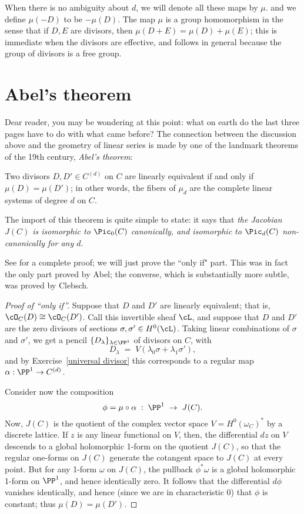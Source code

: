 When there is no ambiguity about $d$, we will denote all these maps  by $\mu$.  and  
we define $\mu(-D)$ to be $-\mu(D)$. 
The map $\mu$ is a group homomorphism in the sense that if $D, E$ are divisors, then
$\mu (D+E) = \mu(D) + \mu(E)$; this is immediate when the divisors are effective, and 
follows in general because the group of divisors is a free group.

\section{Abel's theorem}

Dear reader, you may be wondering at this point: what on earth do the last three pages have to do with what came before? The connection between the discussion above and the geometry of linear series is made by one of the landmark theorems of the 19th century, \emph{Abel's theorem}:

\begin{theorem}
Two divisors $D, D' \in C^{(d)}$ on $C$ are linearly equivalent if and only if $\mu(D) = \mu(D')$; in other words, the fibers of $\mu_d$ are the complete linear systems of degree $d$ on $C$.
\end{theorem}

The import of this theorem is quite simple to state: it says that \emph{the Jacobian $J(C)$ is isomorphic to $\Pic_0(C)$ canonically, and isomorphic to $\Pic_d(C)$ non-canonically for any $d$}.

See \cite[Section 2.2]{Griffiths-Harris1978}  for a complete proof; we will just prove the ``only if" part. This was in fact the only part proved by Abel; the converse, which is substantially more subtle, was proved by Clebsch.

\begin{proof}[Proof of ``only if'']
Suppose that $D$ and $D'$ are linearly equivalent; that is, $\cO_C(D) \cong \cO_C(D')$. Call this invertible sheaf $\cL$, and suppose that $D$ and $D'$ are the zero divisors of sections $\sigma, \sigma' \in H^0(\cL)$.
Taking linear combinations of $\sigma$ and $\sigma'$, we get a pencil $\{D_\lambda\}_{\lambda \in \PP^1}$ of divisors on $C$, with
$$
D_\lambda \; = \; V(\lambda_0\sigma + \lambda_1\sigma'),
$$
and by Exercise~\ref{universal divisor} this corresponds to a regular map $\alpha : \PP^1 \to C^{(d)}$. 

Consider now the composition
$$
\phi = \mu \circ \alpha \; : \; \PP^1 \; \to \; J(C).
$$
Now, $J(C)$ is the quotient of the complex vector space $V = H^0(\omega_C)^*$ by a discrete lattice. If $z$ is any linear functional on $V$, then, the differential $dz$  on $V$ descends to a global holomorphic 1-form on the quotient $J(C)$, so that the regular one-forms on $J(C)$ generate the cotangent space to $J(C)$ at every point. But for any 1-form $\omega$ on $J(C)$, the pullback $\phi^*\omega$ is a global holomorphic 1-form on $\PP^1$, and hence identically zero. It follows that the differential $d\phi$ vanishes identically, and hence (since we are in characteristic 0) that $\phi$ is constant; thus $\mu(D) = \mu(D')$.
\end{proof}

